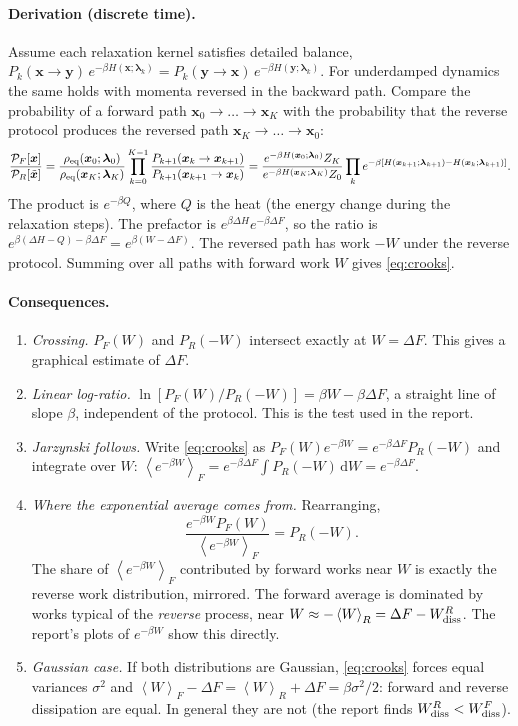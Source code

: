 \documentclass[11pt,a4paper]{article}
\newcommand{\dd}{\mathrm{d}}
\newcommand{\avg}[1]{\left\langle #1\right\rangle}
\newcommand{\lam}{\bm{\lambda}}
\newcommand{\Wd}{W_{\rm diss}}
\begin{document}
\paragraph{Derivation (discrete time).} Assume each relaxation kernel satisfies detailed balance,
$P_k(\bm x\to\bm y)\,e^{-\beta H(\bm x;\lam_k)}=P_k(\bm y\to\bm x)\,e^{-\beta H(\bm y;\lam_k)}$. For
underdamped dynamics the same holds with momenta reversed in the backward path. Compare the
probability of a forward path $\bm x_0\to\dots\to\bm x_K$ with the probability that the reverse
protocol produces the reversed path $\bm x_K\to\dots\to\bm x_0$:
\begin{equation}
\frac{\mathcal P_F[\bm x]}{\mathcal P_R[\tilde{\bm x}]}
=\frac{\rho_{\rm eq}(\bm x_0;\lam_0)}{\rho_{\rm eq}(\bm x_K;\lam_K)}
\prod_{k=0}^{K-1}\frac{P_{k+1}(\bm x_k\to\bm x_{k+1})}{P_{k+1}(\bm x_{k+1}\to\bm x_k)}
=\frac{e^{-\beta H(\bm x_0;\lam_0)}Z_K}{e^{-\beta H(\bm x_K;\lam_K)}Z_0}
\prod_{k}e^{-\beta[H(\bm x_{k+1};\lam_{k+1})-H(\bm x_k;\lam_{k+1})]}.
\end{equation}
The product is $e^{-\beta Q}$, where $Q$ is the heat (the energy change during the relaxation steps). The prefactor is
$e^{\beta\Delta H}e^{-\beta\Delta F}$, so the ratio is $e^{\beta(\Delta H-Q)-\beta\Delta F}=e^{\beta(W-\Delta F)}$.
The reversed path has work $-W$ under the reverse protocol. Summing over all paths with forward work $W$ gives
\eqref{eq:crooks}.

\paragraph{Consequences.}
\begin{enumerate}[leftmargin=*]
\item \emph{Crossing.} $P_F(W)$ and $P_R(-W)$ intersect exactly at $W=\Delta F$. This gives a
graphical estimate of $\Delta F$.
\item \emph{Linear log-ratio.} $\ln[P_F(W)/P_R(-W)]=\beta W-\beta\Delta F$, a straight line of slope
$\beta$, independent of the protocol. This is the test used in the report.
\item \emph{Jarzynski follows.} Write \eqref{eq:crooks} as $P_F(W)e^{-\beta W}=e^{-\beta\Delta F}P_R(-W)$
and integrate over $W$: $\avg{e^{-\beta W}}_F=e^{-\beta\Delta F}\int P_R(-W)\,\dd W=e^{-\beta\Delta F}$.
\item \emph{Where the exponential average comes from.} Rearranging,
\begin{equation}
\frac{e^{-\beta W}P_F(W)}{\avg{e^{-\beta W}}_F}=P_R(-W).
\label{eq:share}
\end{equation}
The share of $\avg{e^{-\beta W}}_F$ contributed by forward works near $W$ is exactly the reverse
work distribution, mirrored. The forward average is dominated by works typical of the
\emph{reverse} process, near $W\approx-\avg{W}_R=\Delta F-\Wd^R$. The report's plots of
$e^{-\beta W}$ show this directly.
\item \emph{Gaussian case.} If both distributions are Gaussian, \eqref{eq:crooks} forces equal
variances $\sigma^2$ and $\avg W_F-\Delta F=\avg W_R+\Delta F=\beta\sigma^2/2$: forward and reverse
dissipation are equal. In general they are not (the report finds $\Wd^R<\Wd^F$).
\end{enumerate}
\end{document}
